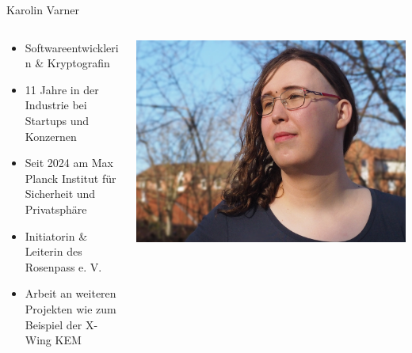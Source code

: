 \begin{frame}{Karolin Varner}
  \begin{columns}[fullwidth,c]

    \begin{column}{.7\linewidth}
      \begin{itemize}
        \item Softwareentwicklerin \& Kryptografin
        \item 11 Jahre in der Industrie bei Startups und Konzernen
        \item Seit 2024 am Max Planck Institut für Sicherheit und Privatsphäre
        \item Initiatorin \& Leiterin des Rosenpass e. V.
        \item Arbeit an weiteren Projekten wie zum Beispiel der X-Wing KEM
      \end{itemize}
    \end{column}%
    \begin{column}{.3\linewidth}
      \includegraphics[width=.92\linewidth,trim=200 0 100 0,clip]{graphics/karolin-varner.jpg}
    \end{column}
  \end{columns}
\end{frame}

